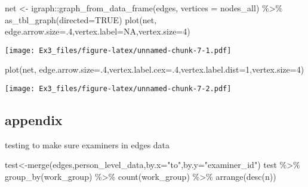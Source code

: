 \documentclass[
]{article}
\newenvironment{Shaded}{\begin{snugshade}}{\end{snugshade}}
\newcommand{\AttributeTok}[1]{\textcolor[rgb]{0.77,0.63,0.00}{#1}}
\newcommand{\ConstantTok}[1]{\textcolor[rgb]{0.00,0.00,0.00}{#1}}
\newcommand{\DecValTok}[1]{\textcolor[rgb]{0.00,0.00,0.81}{#1}}
\newcommand{\FunctionTok}[1]{\textcolor[rgb]{0.00,0.00,0.00}{#1}}
\newcommand{\NormalTok}[1]{#1}
\newcommand{\OtherTok}[1]{\textcolor[rgb]{0.56,0.35,0.01}{#1}}
\newcommand{\SpecialCharTok}[1]{\textcolor[rgb]{0.00,0.00,0.00}{#1}}
\newcommand{\StringTok}[1]{\textcolor[rgb]{0.31,0.60,0.02}{#1}}
\begin{document}
\begin{Shaded}
\begin{Highlighting}[]
\NormalTok{net }\OtherTok{\textless{}{-}}\NormalTok{ igraph}\SpecialCharTok{::}\FunctionTok{graph\_from\_data\_frame}\NormalTok{(edges, }\AttributeTok{vertices =}\NormalTok{ nodes\_all) }\SpecialCharTok{\%\textgreater{}\%} \FunctionTok{as\_tbl\_graph}\NormalTok{(}\AttributeTok{directed=}\ConstantTok{TRUE}\NormalTok{)}
\FunctionTok{plot}\NormalTok{(net, }\AttributeTok{edge.arrow.size=}\NormalTok{.}\DecValTok{4}\NormalTok{,}\AttributeTok{vertex.label=}\ConstantTok{NA}\NormalTok{,}\AttributeTok{vertex.size=}\DecValTok{4}\NormalTok{)}
\end{Highlighting}
\end{Shaded}

\texttt{[image: Ex3\_files/figure-latex/unnamed-chunk-7-1.pdf]}

\begin{Shaded}
\begin{Highlighting}[]
\FunctionTok{plot}\NormalTok{(net, }\AttributeTok{edge.arrow.size=}\NormalTok{.}\DecValTok{4}\NormalTok{,}\AttributeTok{vertex.label.cex=}\NormalTok{.}\DecValTok{4}\NormalTok{,}\AttributeTok{vertex.label.dist=}\DecValTok{1}\NormalTok{,}\AttributeTok{vertex.size=}\DecValTok{4}\NormalTok{)}
\end{Highlighting}
\end{Shaded}

\texttt{[image: Ex3\_files/figure-latex/unnamed-chunk-7-2.pdf]}

\hypertarget{appendix}{%
\subsection{appendix}\label{appendix}}

testing to make sure examiners in edges data

\begin{Shaded}
\begin{Highlighting}[]
\NormalTok{test}\OtherTok{\textless{}{-}}\FunctionTok{merge}\NormalTok{(edges,person\_level\_data,}\AttributeTok{by.x=}\StringTok{"to"}\NormalTok{,}\AttributeTok{by.y=}\StringTok{"examiner\_id"}\NormalTok{)}
\NormalTok{test }\SpecialCharTok{\%\textgreater{}\%}
  \FunctionTok{group\_by}\NormalTok{(work\_group) }\SpecialCharTok{\%\textgreater{}\%}
  \FunctionTok{count}\NormalTok{(work\_group) }\SpecialCharTok{\%\textgreater{}\%}
  \FunctionTok{arrange}\NormalTok{(}\FunctionTok{desc}\NormalTok{(n))}
\end{Highlighting}
\end{Shaded}
\end{document}
